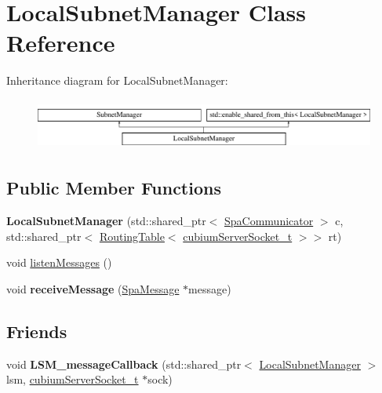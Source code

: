 \hypertarget{classLocalSubnetManager}{}\section{Local\+Subnet\+Manager Class Reference}
\label{classLocalSubnetManager}
Inheritance diagram for Local\+Subnet\+Manager\+:\begin{figure}[H]
\begin{center}
\leavevmode
\includegraphics[height=1.702128cm]{classLocalSubnetManager}
\end{center}
\end{figure}
\subsection*{Public Member Functions}
\begin{DoxyCompactItemize}
\item 
\mbox{\label{classLocalSubnetManager_ae77d1c9d08c317f43e7a36d1ae8671f3}} 
{\bfseries Local\+Subnet\+Manager} (std\+::shared\+\_\+ptr$<$ \hyperlink{classSpaCommunicator}{Spa\+Communicator} $>$ c, std\+::shared\+\_\+ptr$<$ \hyperlink{classRoutingTable}{Routing\+Table}$<$ \hyperlink{structcubiumServerSocket__t}{cubium\+Server\+Socket\+\_\+t} $>$$>$ rt)
\item 
void \hyperlink{classLocalSubnetManager_a8cd2838196edcd75a77f532bce15c2fd}{listen\+Messages} ()
\item 
\mbox{\label{classLocalSubnetManager_a6eb06d8e5e5c3ae23552e3cde0f4c216}} 
void {\bfseries receive\+Message} (\hyperlink{structSpaMessage}{Spa\+Message} $\ast$message)
\end{DoxyCompactItemize}
\subsection*{Friends}
\begin{DoxyCompactItemize}
\item 
\mbox{\label{classLocalSubnetManager_a15ed1b4951854aeb9f6bdd54816a16be}} 
void {\bfseries L\+S\+M\+\_\+message\+Callback} (std\+::shared\+\_\+ptr$<$ \hyperlink{classLocalSubnetManager}{Local\+Subnet\+Manager} $>$ lsm, \hyperlink{structcubiumServerSocket__t}{cubium\+Server\+Socket\+\_\+t} $\ast$sock)
\end{DoxyCompactItemize}
